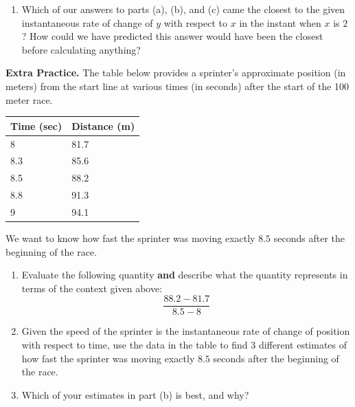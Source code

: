 \documentclass[10pt]{article}
\begin{document}
\begin{enumerate}
\hfill {\small\it(part (d) is on the next page $\to$)}

\newpage

\,

\vspace{-0.4in}

\item[(d)] Which of our answers to parts (a), (b), and (c) came the closest to the given instantaneous rate of change of $y$ with respect to $x$ in the instant when $x$ is $2$? How could we have predicted this answer would have been the closest before calculating anything?\\

\vfill
\vfill

\end{enumerate}

{\bf\color{blue} Extra Practice.} \reversemarginpar{} The table below provides a sprinter's approximate position (in meters) from the start line at various times (in seconds) after the start of the 100 meter race.

\begin{center}
    \begin{tabular}{| l | l |}
    \hline
    Time (sec) & Distance (m)\\
    \hline
    8 & 81.7\\
    \hline
    8.3 & 85.6\\
    \hline
    8.5 & 88.2\\
    \hline
    8.8 & 91.3\\
    \hline
    9 & 94.1\\
    \hline
    \end{tabular}
\end{center}

We want to know how fast the sprinter was moving exactly $8.5$ seconds after the beginning of the race. 

\begin{enumerate}
\item[(a)] Evaluate the following quantity {\bf and} describe what the quantity represents in terms of the context given above:
\[ \dfrac{88.2-81.7}{8.5-8} \]

    \vfill
    
\item[(b)]Given the speed of the sprinter is the instantaneous rate of change of position with respect to time, use the data in the table to find 3 different estimates of how fast the sprinter was moving exactly $8.5$ seconds after the beginning of the race.

    \vfill
    \vfill

\item[(c)] Which of your estimates in part (b) is best, and why?

    \vfill

\end{enumerate}
\end{document}
